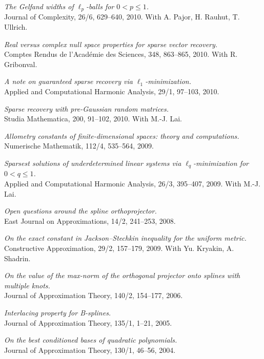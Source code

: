 \documentclass[11pt]{article}
\begin{document}
\item {\sl The Gelfand widths of $\ell_p$-balls for $0<p \le 1$.}\\
Journal of Complexity, 26/6, 629--640, 2010. 
With A. Pajor, H. Rauhut, T. Ullrich.
\item {\sl Real versus complex null space properties for sparse vector recovery.}\\
Comptes Rendus de l'Acad\'emie des Sciences, 348, 863--865, 2010. 
With R. Gribonval.
\item {\sl A note on guaranteed sparse recovery via $\ell_1$-minimization.}\\
Applied and Computational Harmonic Analysis, 29/1, 97--103, 2010.
\item {\sl Sparse recovery with pre-Gaussian random matrices.}\\
Studia Mathematica, 200, 91--102, 2010. 
With M.-J. Lai.
\item {\sl Allometry constants of finite-dimensional spaces: theory and computations.}\\
Numerische Mathematik,  112/4, 535--564, 2009.
\item {\sl  Sparsest solutions of underdetermined linear systems via $\ell_q$-minimization for $0 <  q  \le  1$.}\\
Applied and Computational Harmonic Analysis, 26/3, 395--407, 2009. 
With M.-J. Lai.
\item {\sl Open questions around the spline orthoprojector.}\\
East Journal on Approximations, 14/2, 241--253, 2008.
\item {\sl On the exact constant in Jackson--Stechkin inequality for the uniform metric.}\\
Constructive Approximation, 29/2, 157--179, 2009. 
With Yu. Kryakin, A. Shadrin.
\item {\sl On the value of the max-norm of the orthogonal projector onto splines with multiple knots.}\\
Journal of Approximation Theory, 140/2, 154--177, 2006.
\item {\sl  Interlacing property for B-splines.}\\
Journal of Approximation Theory, 135/1, 1--21, 2005.
\item {\sl On the best conditioned bases of quadratic polynomials.}\\
Journal of Approximation Theory, 130/1, 46--56, 2004.
\eetaremune
	
\end{document}
